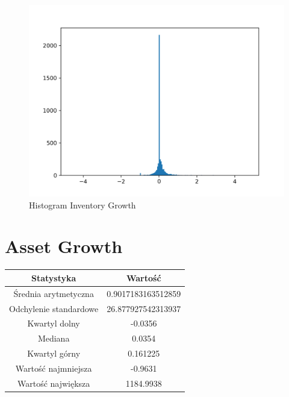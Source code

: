\documentclass{article}
\begin{document}
\begin{figure}[h!]
    \includegraphics[width=\linewidth]{variables/Inventory Growth.png}
    \caption{Histogram Inventory Growth }
\end{figure}\section{ Asset Growth }

\begin{center}
    \begin{tabular}{|c | c|} 
    \hline
    Statystyka & Wartość \\
    \hline\hline
    Średnia arytmetyczna & 0.9017183163512859 \\ 
    \hline
    Odchylenie standardowe & 26.877927542313937 \\
    \hline
    Kwartyl dolny & -0.0356 \\
    \hline
    Mediana & 0.0354 \\
    \hline
    Kwartyl górny & 0.161225 \\
    \hline
    Wartość najmniejsza & -0.9631 \\
    \hline
    Wartość największa & 1184.9938 \\
    \hline
   \end{tabular}
\end{center}
\end{document}
